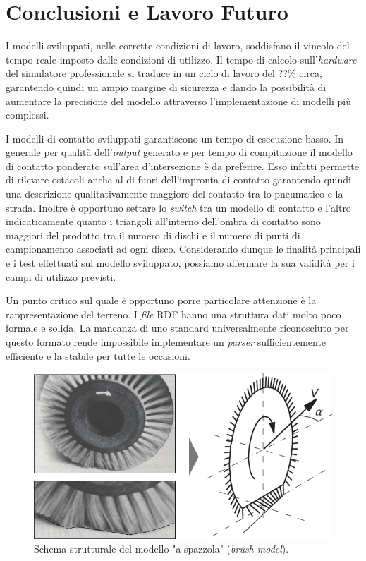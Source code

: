 \chapter{Conclusioni e Lavoro Futuro}
\label{Conclusione}
%
I modelli sviluppati, nelle corrette condizioni di lavoro, soddisfano il vincolo del tempo reale imposto dalle condizioni di utilizzo. Il tempo di calcolo sull'\textit{hardware} del simulatore professionale si traduce in un ciclo di lavoro del ??\% circa, garantendo quindi un ampio margine di sicurezza e dando la possibilità di aumentare la precisione del modello attraverso l'implementazione di modelli più complessi.

I modelli di contatto sviluppati garantiscono un tempo di esecuzione basso. In generale per qualità dell'\textit{output} generato e per tempo di compitazione il modello di contatto ponderato sull'area d'intersezione è da preferire. Esso infatti permette di rilevare ostacoli anche al di fuori dell'impronta di contatto garantendo quindi una descrizione qualitativamente maggiore del contatto tra lo pneumatico e la strada. Inoltre è opportuno settare lo \textit{switch} tra un modello di contatto e l'altro indicaticamente quanto i triangoli all'interno dell'ombra di contatto sono maggiori del prodotto tra il numero di dischi e il numero di punti di campionamento associati ad ogni disco. Considerando dunque le finalità principali e i test effettuati sul modello sviluppato, possiamo affermare la sua validità per i campi di utilizzo previsti.

Un punto critico sul quale è opportuno porre particolare attenzione è la rappresentazione del terreno. I \textit{file} \ac{RDF} hanno una struttura dati molto poco formale e solida. La mancanza di uno standard universalmente riconosciuto per questo formato rende impossibile implementare un \textit{parser} sufficientemente efficiente e la stabile per tutte le occasioni.

\begin{figure}
	\centering
	\includegraphics[width=0.7\linewidth]{Figures/brush_model}
	\caption{Schema strutturale del modello "a spazzola" (\textit{brush model}). }
	\label{brushmodel}
\end{figure}

